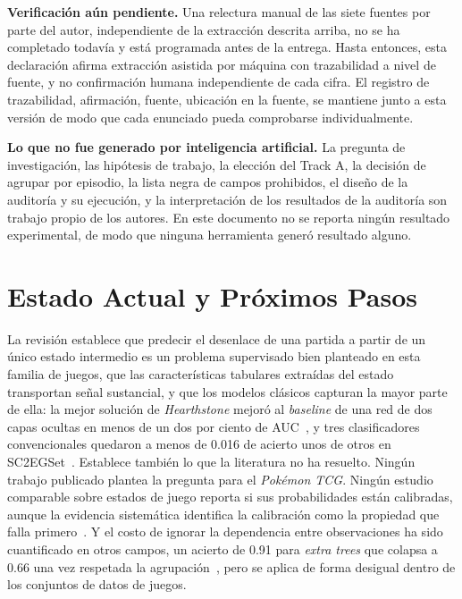 \documentclass[conference]{IEEEtran}
\begin{document}
\noindent\textbf{Verificaci\'on a\'un pendiente.} Una relectura manual de las
siete fuentes por parte del autor, independiente de la extracci\'on descrita
arriba, no se ha completado todav\'ia y est\'a programada antes de la
entrega. Hasta entonces, esta declaraci\'on afirma extracci\'on asistida por
m\'aquina con trazabilidad a nivel de fuente, y no confirmaci\'on humana
independiente de cada cifra. El registro de trazabilidad, afirmaci\'on,
fuente, ubicaci\'on en la fuente, se mantiene junto a esta versi\'on de
modo que cada enunciado pueda comprobarse individualmente.

\noindent\textbf{Lo que no fue generado por inteligencia artificial.} La
pregunta de investigaci\'on, las hip\'otesis de trabajo, la elecci\'on del
Track A, la decisi\'on de agrupar por episodio, la lista negra de campos
prohibidos, el dise\~no de la auditor\'ia y su ejecuci\'on, y la
interpretaci\'on de los resultados de la auditor\'ia son trabajo propio de
los autores. En este documento no se reporta ning\'un resultado experimental,
de modo que ninguna herramienta gener\'o resultado alguno.

\section{Estado Actual y Pr\'oximos Pasos}
\label{sec:conclusion}

La revisi\'on establece que predecir el desenlace de una partida a partir de
un \'unico estado intermedio es un problema supervisado bien planteado en
esta familia de juegos, que las caracter\'isticas tabulares extra\'idas del
estado transportan se\~nal sustancial, y que los modelos cl\'asicos capturan
la mayor parte de ella: la mejor soluci\'on de \emph{Hearthstone} mejor\'o al
\emph{baseline} de una red de dos capas ocultas en menos de un dos por ciento
de AUC~\cite{janusz_hearthstone_2017}, y tres clasificadores convencionales
quedaron a menos de 0.016 de acierto unos de otros en
SC2EGSet~\cite{bialecki_sc2egset_2023}. Establece tambi\'en lo que la
literatura no ha resuelto. Ning\'un trabajo publicado plantea la pregunta
para el \emph{Pok\'emon TCG}. Ning\'un estudio comparable sobre estados de
juego reporta si sus probabilidades est\'an calibradas, aunque la evidencia
sistem\'atica identifica la calibraci\'on como la propiedad que falla
primero~\cite{guo_temporalshift_2021}. Y el costo de ignorar la dependencia
entre observaciones ha sido cuantificado en otros campos, un acierto de
0.91 para \emph{extra trees} que colapsa a 0.66 una vez respetada la
agrupaci\'on~\cite{karbalaie_participantaware_2026}, pero se aplica de
forma desigual dentro de los conjuntos de datos de juegos.
\end{document}
